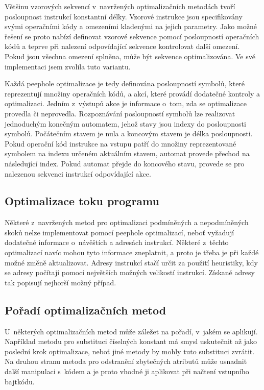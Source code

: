 Většinu vzorových sekvencí v~navržených optimalizačních metodách tvoří posloupnost instrukcí konstantní délky. Vzorové instrukce jsou specifikovány svými operačními kódy a omezeními kladenými na jejich parametry. Jako možné řešení se proto nabízí definovat vzorové sekvence pomocí posloupností operačních kódů a teprve při nalezení odpovídající sekvence kontrolovat další omezení. Pokud jsou všechna omezení splněna, může být sekvence optimalizována. Ve své implementaci jsem zvolila tuto variantu. 

Každá peephole optimalizace je tedy definována posloupností symbolů, které reprezentují množiny operačních kódů, a akcí, které provádí dodatečné kontroly a optimalizaci. Jedním z~výstupů akce je informace o~tom, zda se optimalizace provedla či neprovedla.
Rozpoznávání posloupností symbolů lze realizovat jednoduchým konečným automatem, jehož stavy jsou indexy do posloupnosti symbolů. Počátečním stavem je nula a koncovým stavem je délka posloupnosti. Pokud operační kód instrukce na vstupu patří do množiny reprezentované symbolem na indexu určeném aktuálním stavem, automat provede přechod na následující index. Pokud automat přejde do koncového stavu, provede se pro nalezenou sekvenci instrukcí odpovídající akce.

\subsection{Optimalizace toku programu}\label{Jbyco:Design:Flow}

Některé z~navržených metod pro optimalizaci podmíněných a nepodmíněných skoků nelze implementovat pomocí peephole optimalizací, neboť vyžadují dodatečné informace o~návěštích a adresách instrukcí. Některé z~těchto optimalizací navíc mohou tyto informace zneplatnit, a proto je třeba je při každé možné změně aktualizovat. 
Adresy instrukcí stačí určit za použití heuristiky, kdy se adresy počítají pomocí největších možných velikostí instrukcí. Získané adresy tak popisují nejhorší možný případ.

\subsection{Pořadí optimalizačních metod} \label{Jbyco:Design:Ordering}

U~některých optimalizačních metod může záležet na pořadí, v~jakém se aplikují. Například metodu pro substituci číselných konstant má smysl uskutečnit až jako poslední krok optimalizace, neboť jiné metody by mohly tuto substituci zvrátit. Na druhou stranu metoda pro odstranění zbytečných atributů může usnadnit další manipulaci s~kódem a je proto vhodné ji aplikovat při načtení vstupního bajtkódu. 

